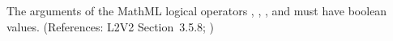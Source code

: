 The arguments of the MathML logical operators ,
, , and  must have boolean values.
(References: L2V2 Section~3.5.8; )
